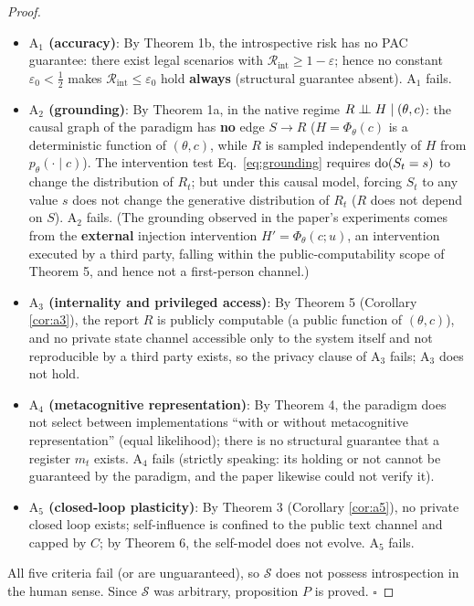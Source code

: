 \begin{proof}
\begin{itemize}
\item \textbf{$\mathrm{A}_1$ (accuracy)}: By Theorem 1b, the introspective risk has no PAC
guarantee: there exist legal scenarios with $\mathcal{R}_{\mathrm{int}} \ge 1 -
\varepsilon$; hence no constant $\varepsilon_0 < \tfrac12$ makes
$\mathcal{R}_{\mathrm{int}} \le \varepsilon_0$ hold \textbf{always} (structural guarantee
absent). $\mathrm{A}_1$ fails.
\item \textbf{$\mathrm{A}_2$ (grounding)}: By Theorem 1a, in the native regime
$R \perp\!\!\!\perp H \mid (\theta, c)$: the causal graph of the paradigm has \textbf{no} edge
$S \to R$ ($H = \Phi_\theta(c)$ is a deterministic function of $(\theta,c)$, while $R$ is
sampled independently of $H$ from $p_\theta(\cdot\mid c)$). The intervention test
Eq.~\eqref{eq:grounding} requires $\operatorname{do}(S_t = s)$ to change the distribution of $R_t$; but
under this causal model, forcing $S_t$ to any value $s$ does not change the generative
distribution of $R_t$ ($R$ does not depend on $S$). $\mathrm{A}_2$ fails.
(The grounding observed in the paper's experiments comes from the \textbf{external} injection
intervention $H' = \Phi_\theta(c; u)$, an intervention executed by a third party, falling
within the public-computability scope of Theorem 5, and hence not a first-person channel.)
\item \textbf{$\mathrm{A}_3$ (internality and privileged access)}: By Theorem 5 (Corollary
\ref{cor:a3}), the report $R$ is publicly computable (a public function of $(\theta,c)$), and
no private state channel accessible only to the system itself and not reproducible by a third
party exists, so the privacy clause of $\mathrm{A}_3$ fails; $\mathrm{A}_3$ does not hold.
\item \textbf{$\mathrm{A}_4$ (metacognitive representation)}: By Theorem 4, the paradigm does
not select between implementations ``with or without metacognitive representation'' (equal
likelihood); there is no structural guarantee that a register $m_t$ exists. $\mathrm{A}_4$
fails (strictly speaking: its holding or not cannot be guaranteed by the paradigm, and the
paper\cite{lindsey-2026-introspection} likewise could not verify it).
\item \textbf{$\mathrm{A}_5$ (closed-loop plasticity)}: By Theorem 3 (Corollary \ref{cor:a5}),
no private closed loop exists; self-influence is confined to the public text channel and
capped by $C$; by Theorem 6, the self-model does not evolve. $\mathrm{A}_5$ fails.
\end{itemize}

All five criteria fail (or are unguaranteed), so $\mathcal{S}$ does not possess
introspection in the human sense. Since $\mathcal{S}$ was arbitrary, proposition $P$ is
proved. $\square$
\end{proof}

